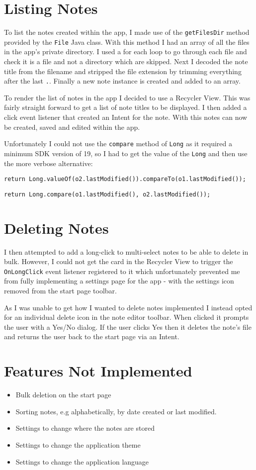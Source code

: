 \section{Listing Notes}

To list the notes created within the app, I made use of the \texttt{getFilesDir} method provided by the \texttt{File} Java class. With this method I had an array of all the files in the app's private directory. I used a for each loop to go through each file and check it is a file and not a directory which are skipped. Next I decoded the note title from the filename and stripped the file extension by trimming everything after the last \texttt{.}. Finally a new note instance is created and added to an array.

To render the list of notes in the app I decided to use a Recycler View. This was fairly straight forward to get a list of note titles to be displayed. I then added a click event listener that created an Intent for the note. With this notes can now be created, saved and edited within the app.

Unfortunately I could not use the \texttt{compare} method of \texttt{Long} as it required a minimum SDK version of 19, so I had to get the value of the \texttt{Long} and then use the more verbose alternative:

\texttt{return Long.valueOf(o2.lastModified()).compareTo(o1.lastModified());}

\texttt{return Long.compare(o1.lastModified(), o2.lastModified());}

\section{Deleting Notes}

I then attempted to add a long-click to multi-select notes to be able to delete  in bulk. However, I could not get the card in the Recycler View to trigger the \texttt{OnLongClick} event listener registered to it which unfortunately prevented me from fully implementing a settings page for the app - with the settings icon removed from the start page toolbar.

As I was unable to get how I wanted to delete notes implemented I instead opted for an individual delete icon in the note editor toolbar. When clicked it prompts the user with a Yes/No dialog. If the user clicks Yes then it deletes the note's file and returns the user back to the start page via an Intent.

\section{Features Not Implemented}

\begin{itemize}
  \item Bulk deletion on the start page
  \item Sorting notes, e.g alphabetically, by date created or last modified.
  \item Settings to change where the notes are stored
  \item Settings to change the application theme
  \item Settings to change the application language
\end{itemize}
